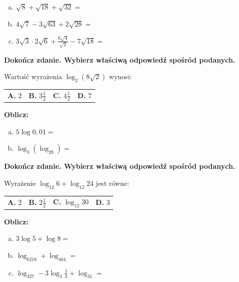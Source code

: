 \documentclass[12pt,a4paper]{article}
\theoremstyle{break}
\begin{document}
	\begin{enumerate}[a)]
		\item $\sqrt{8}+\sqrt{18}+\sqrt{32}=$
		\item $4\sqrt{7}-3\sqrt{63}+2\sqrt{28}=$
		\item $3\sqrt{3}\cdot2\sqrt{6}+\frac{6\sqrt{4}}{\sqrt{2}}-7\sqrt{18}=$
	\end{enumerate}

	
	\begin{zad}[0-1]
		\textbf{Dokończ zdanie. Wybierz właściwą odpowiedź spośród podanych.}
	\end{zad} 
	
	Wartość wyrażenia $\log_2(8\sqrt{2})$ wynosi:
	
	\vspace{0.5cm}
	\begin{tabular}{p{3.5cm} p{3.5cm} p{3.5cm} p{3.5cm}}
		\textbf{A. }$2$&
		\textbf{B. }$3\frac{1}{2}$&
		\textbf{C. }$4\frac{1}{2}$&
		\textbf{D. }$7$\\
	\end{tabular}
	
	
	\begin{zad}[0-2]
		\textbf{Oblicz:}
	\end{zad} 
	
	\begin{enumerate}[a)]
		\item $5\log0,01=$
		\item $\log_3(\log_28)=$
	\end{enumerate}
	
	
	\begin{zad}[0-1]
		\textbf{Dokończ zdanie. Wybierz właściwą odpowiedź spośród podanych.}
	\end{zad} 
	
	Wyrażenie $\log_{12} 6 + \log_{12} 24$ jest równe:
	
	\vspace{0.5cm}
	\begin{tabular}{p{3.5cm} p{3.5cm} p{3.5cm} p{3.5cm}}
		\textbf{A. }$2$&
		\textbf{B. }$2\frac{1}{2}$&
		\textbf{C. }$\log_{12}30$&
		\textbf{D. }$3$\\
	\end{tabular}



	
	\begin{zad}[0-3]
		\textbf{Oblicz:}
	\end{zad} 
	
	\begin{enumerate}[a)]
		\item $3\log5+\log8=$
		\item $\log_6216+\log_464=$
		\item $\log_327-3\log_3\frac{1}{3}+\log_31=$
	\end{enumerate}
	
\end{document}
